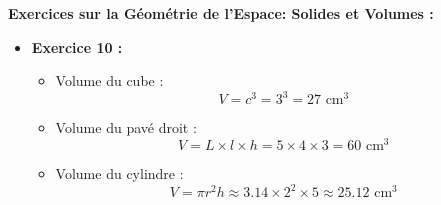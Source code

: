 \documentclass{article}
\begin{document}
\begin{tcolorbox}[colback=green!10!white, colframe=green!75!black, title=\textcolor{white}{Corrections }, sharp corners=south]
    \vspace{10pt}

    \textbf{Exercices sur la Géométrie de l'Espace: Solides et Volumes :}

    \begin{itemize}
        \item \textbf{Exercice 10 :} 
            \begin{itemize}
                \item Volume du cube : 
                    \[
                    V = c^3 = 3^3 = 27 \text{ cm}^3
                    \]
                \item Volume du pavé droit : 
                    \[
                    V = L \times l \times h = 5 \times 4 \times 3 = 60 \text{ cm}^3
                    \]
                \item Volume du cylindre : 
                    \[
                    V = \pi r^2 h \approx 3.14 \times 2^2 \times 5 \approx 25.12 \text{ cm}^3
                    \]
            \end{itemize}
    \end{itemize}        
\end{tcolorbox}
\end{document}
